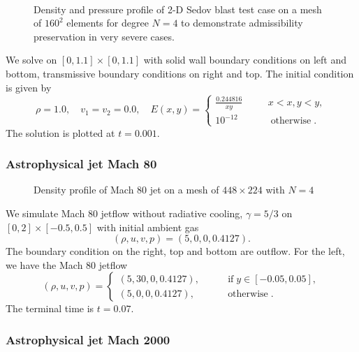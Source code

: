 \documentclass{beamer}
\newcommand{\tmop}[1]{\ensuremath{\operatorname{#1}}}
\begin{document}
{{\begin{frame}
  \begin{figure}[h]
    \
    
    \caption{Density and pressure profile of 2-D Sedov blast test case
    {\cite{SEDOV1959146}} on a mesh of $160^2$ elements for degree $N = 4$ to
    demonstrate admissibility preservation in very severe cases.}
  \end{figure}
  
  We solve on $[0, 1.1] \times [0, 1.1]$ with solid wall boundary conditions
  on left and bottom, transmissive boundary conditions on right and top. The
  initial condition is given by
  \[ \rho = 1.0, \quad v_1 = v_2 = 0.0, \quad E (x, y) =
     \left\{\begin{array}{lll}
       \frac{0.244816}{x y} & \quad & x < x, y < y,\\
       10^{- 12} &  & \tmop{otherwise} .
     \end{array}\right. \]
  The solution is plotted at $t = 0.001$.
  \[ \  \]
\end{frame}}{\begin{frame}
  \frametitle{Astrophysical jet Mach 80
  {\cite{b0ca7a5eeb40423caed7422ff5e0b525}}}
  
  \begin{figure}[h]
    \caption{Density profile of Mach 80 jet on a mesh of $448 \times 224$ with
    $N = 4$}
  \end{figure}
  
  We simulate Mach 80 jetflow {\cite{b0ca7a5eeb40423caed7422ff5e0b525}}
  without radiative cooling, $\gamma = 5 / 3$ on $[0, 2] \times [- 0.5, 0.5]$
  with initial ambient gas
  \[ (\rho, u, v, p) = (5, 0, 0, 0.4127) . \]
  The boundary condition on the right, top and bottom are outflow. For the
  left, we have the Mach 80 jetflow
  \[ (\rho, u, v, p) = \left\{\begin{array}{lll}
       (5, 30, 0, 0.4127), & \quad & \tmop{if} y \in [- 0.05, 0.05],\\
       (5, 0, 0, 0.4127), &  & \tmop{otherwise} .
     \end{array}\right. \]
  The terminal time is $t = 0.07$.
\end{frame}}{\begin{frame}
  \frametitle{Astrophysical jet Mach 2000
  {\cite{b0ca7a5eeb40423caed7422ff5e0b525}}}
  

\end{frame}}}
\end{document}
